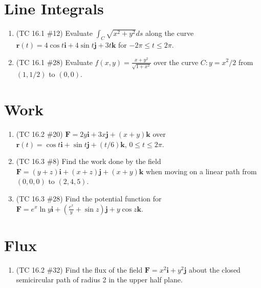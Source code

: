 \documentclass[letterpaper, 11pt]{article}
\begin{document}
\section{Line Integrals}
\begin{enumerate}
\item (TC 16.1 \#12) Evaluate $\int_C \sqrt{x^2 + y^2} ds$ along the curve $\bm{r}(t) = 4\cos t \bm{i} + 4 \sin t \bm{j} + 3t \bm{k}$ for $-2\pi \leq t \leq 2\pi$. 



\item (TC 16.1 \#28) Evaluate $f(x,y) = \frac{x + y^2}{\sqrt{1 + x^2}}$ over the curve $C : y = x^2/2$ from $(1,1/2)$ to $(0,0)$. 


\end{enumerate}

\section{Work}
\begin{enumerate}
\item (TC 16.2 \#20) $\bm{F} = 2y\bm{i} + 3x \bm{j} + (x + y)\bm{k}$ over $\bm{r}(t) = \cos t \bm{i} + \sin t \bm{j} + (t/6)\bm{k}$, $0 \leq t \leq 2 \pi$. 



\item (TC 16.3 \#8) Find the work done by the field $\bm{F} = (y + z)\bm{i} + (x + z) \bm{j} + (x + y) \bm{k}$ when moving on a linear path from $(0,0,0)$ to $(2,4,5)$. 


\item (TC 16.3 \#28) Find the potential function for $\bm{F} = e^x \ln y \bm{i} + \left( \frac{ e^x}{y} + \sin z\right) \bm{j} + y\cos z \bm{k}$. 


\end{enumerate}

\section{Flux}
\begin{enumerate}
\item (TC 16.2 \#32) Find the flux of the field $\bm{F} = x^2 \bm{i} + y^2 \bm{j}$ about the closed semicircular path of radius 2 in the upper half plane. 


%


\end{enumerate}
\end{document}
